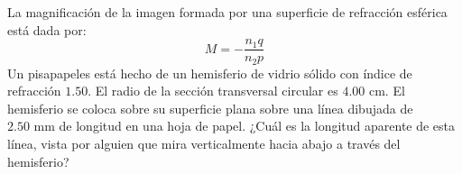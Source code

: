 \item La magnificación de la imagen formada por una superficie de refracción esférica está dada por:
$$ M = -\frac{n_1 q}{n_2 p} $$
Un pisapapeles está hecho de un hemisferio de vidrio sólido con índice de refracción $1.50$. El radio de la sección transversal circular es $4.00\text{ cm}$. El hemisferio se coloca sobre su superficie plana sobre una línea dibujada de $2.50\text{ mm}$ de longitud en una hoja de papel. ¿Cuál es la longitud aparente de esta línea, vista por alguien que mira verticalmente hacia abajo a través del hemisferio?